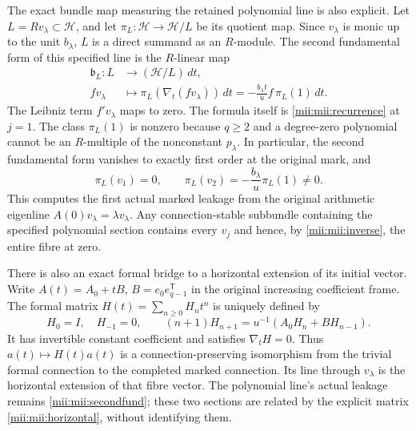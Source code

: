 The exact bundle map measuring the retained polynomial line is
also explicit. Let $L=R v_\lambda\subset\mathscr H$, and let
$\pi_L:\mathscr H\to\mathscr H/L$ be its quotient map. Since
$v_\lambda$ is monic up to the unit $b_\lambda$, $L$ is a direct
summand as an $R$-module. The second fundamental form of this
specified line is the $R$-linear map
\begin{equation}\tag{MII23}\label{mii:mii:secondfund}
 \begin{aligned}
 \mathfrak b_L:L&\longrightarrow(\mathscr H/L)\,dt,\\
 f v_\lambda&\longmapsto
       \pi_L(\nabla_t(fv_\lambda))\,dt
       =-\frac{b_\lambda t}{u}f\,\pi_L(1)\,dt.
 \end{aligned}
\end{equation}
The Leibniz term $f'v_\lambda$ maps to zero. The formula itself
is \eqref{mii:mii:recurrence} at $j=1$. The class $\pi_L(1)$ is
nonzero because $q\ge2$ and a degree-zero polynomial cannot be
an $R$-multiple of the nonconstant $p_\lambda$. In particular,
the second fundamental form vanishes to exactly first order
at the original mark, and
\begin{equation}\tag{MII24}\label{mii:mii:secondjet}
 \pi_L(v_1)=0,\qquad
 \pi_L(v_2)=-\frac{b_\lambda}{u}\pi_L(1)\ne0.
\end{equation}
This computes the first actual marked leakage from the original
arithmetic eigenline $A(0)v_\lambda=\lambda v_\lambda$.
Any connection-stable subbundle containing the specified
polynomial section contains every $v_j$ and hence, by
\eqref{mii:mii:inverse}, the entire fibre at zero.

There is also an exact formal bridge to a horizontal extension
of its initial vector. Write
$A(t)=A_0+tB$, $B=e_0e_{q-1}^{\mathsf T}$ in the original
increasing coefficient frame. The formal matrix
$H(t)=\sum_{n\ge0}H_nt^n$ is uniquely defined by
\begin{equation}\tag{MII25}\label{mii:mii:horizontal}
 H_0=I,\quad H_{-1}=0,\qquad
 (n+1)H_{n+1}=u^{-1}(A_0H_n+B H_{n-1}).
\end{equation}
It has invertible constant coefficient and satisfies
$\nabla_t H=0$. Thus $a(t)\mapsto H(t)a(t)$ is a
connection-preserving isomorphism from the trivial formal
connection to the completed marked connection. Its line through
$v_\lambda$ is the horizontal extension of that fibre vector.
The polynomial line's actual leakage remains
\eqref{mii:mii:secondfund}; these two sections are related by the
explicit matrix \eqref{mii:mii:horizontal}, without identifying them.

